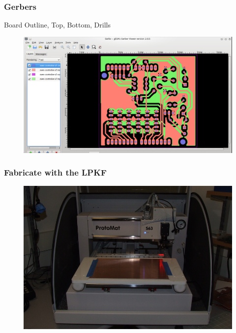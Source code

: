 \documentclass{beamer}
\begin{document}
\begin{frame}
\frametitle{Gerbers}
Board Outline, Top, Bottom, Drills
\begin{figure}
\includegraphics[width=1\linewidth]{gerbv.png}
\end{figure}
\end{frame}


\begin{frame}
\frametitle{Fabricate with the LPKF}
\begin{figure}
\includegraphics[width=1\linewidth]{fab-lpkf.png}
\end{figure}
\end{frame}

\end{document}

